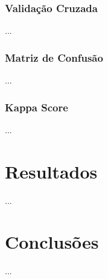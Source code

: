 \documentclass[12pt]{article}
\begin{document}
	\subsubsection{Validação Cruzada}
		...
	\subsubsection{Matriz de Confusão}
		...
	\subsubsection{Kappa Score}
		...
\section{Resultados}
	...
\section{Conclusões}
	...
%
%
%
%
\end{document}

